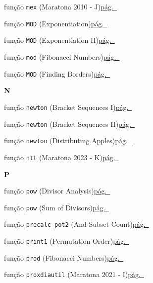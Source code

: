 \documentclass[10pt, a4paper, twocolumn, landscape]{article}
\begin{document}
{\noindent função \texttt{mex} {\scriptsize\color{codegray}(Maratona 2010 - J)}\dotfill\hyperref[fn34]{pág.~\pageref*{fn34}}\par
\noindent função \texttt{MOD} {\scriptsize\color{codegray}(Exponentiation)}\dotfill\hyperref[fn4]{pág.~\pageref*{fn4}}\par
\noindent função \texttt{MOD} {\scriptsize\color{codegray}(Exponentiation II)}\dotfill\hyperref[fn16]{pág.~\pageref*{fn16}}\par
\noindent função \texttt{mod} {\scriptsize\color{codegray}(Fibonacci Numbers)}\dotfill\hyperref[fn23]{pág.~\pageref*{fn23}}\par
\noindent função \texttt{MOD} {\scriptsize\color{codegray}(Finding Borders)}\dotfill\hyperref[fn30]{pág.~\pageref*{fn30}}\par
\par\medskip\textbf{\large N}\par
\noindent função \texttt{newton} {\scriptsize\color{codegray}(Bracket Sequences I)}\dotfill\hyperref[fn44]{pág.~\pageref*{fn44}}\par
\noindent função \texttt{newton} {\scriptsize\color{codegray}(Bracket Sequences II)}\dotfill\hyperref[fn49]{pág.~\pageref*{fn49}}\par
\noindent função \texttt{newton} {\scriptsize\color{codegray}(Distributing Apples)}\dotfill\hyperref[fn22]{pág.~\pageref*{fn22}}\par
\noindent função \texttt{ntt} {\scriptsize\color{codegray}(Maratona 2023 - K)}\dotfill\hyperref[fn40]{pág.~\pageref*{fn40}}\par
\par\medskip\textbf{\large P}\par
\noindent função \texttt{pow} {\scriptsize\color{codegray}(Divisor Analysis)}\dotfill\hyperref[fn46]{pág.~\pageref*{fn46}}\par
\noindent função \texttt{pow} {\scriptsize\color{codegray}(Sum of Divisors)}\dotfill\hyperref[fn3]{pág.~\pageref*{fn3}}\par
\noindent função \texttt{precalc\_pot2} {\scriptsize\color{codegray}(And Subset Count)}\dotfill\hyperref[fn65]{pág.~\pageref*{fn65}}\par
\noindent função \texttt{print1} {\scriptsize\color{codegray}(Permutation Order)}\dotfill\hyperref[fn76]{pág.~\pageref*{fn76}}\par
\noindent função \texttt{prod} {\scriptsize\color{codegray}(Fibonacci Numbers)}\dotfill\hyperref[fn24]{pág.~\pageref*{fn24}}\par
\noindent função \texttt{proxdiautil} {\scriptsize\color{codegray}(Maratona 2021 - I)}\dotfill\hyperref[fn91]{pág.~\pageref*{fn91}}\par
}
\end{document}
